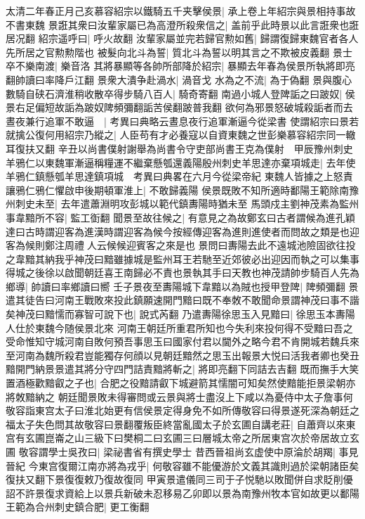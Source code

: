 太清二年春正月己亥慕容紹宗以鐵騎五千夹擊侯景|{
	承上卷上年紹宗與景相持事故不書東魏}
景誑其衆曰汝輩家屬已為高澄所殺衆信之|{
	盖前乎此時景以此言誑衆也誑居况翻}
紹宗遥呼曰|{
	呼火故翻}
汝輩家屬並完若歸官勲如舊|{
	歸謂復歸東魏官者各人先所居之官勲勲階也}
被髮向北斗為誓|{
	質北斗為誓以明其言之不欺被皮義翻}
景士卒不樂南渡|{
	樂音洛}
其將暴顯等各帥所部降於紹宗|{
	暴顯去年春為侯景所執將即亮翻帥讀曰率降戶江翻}
景衆大潰争赴渦水|{
	渦音戈}
水為之不流|{
	為于偽翻}
景與腹心數騎自硖石濟淮稍收散卒得步騎八百人|{
	騎奇寄翻}
南過小城人登陴詬之曰跛奴|{
	侯景右足偏短故詬為跛奴陴頻彌翻詬苦侯翻跛普我翻}
欲何為邪景怒破城殺詬者而去晝夜兼行追軍不敢逼　|{
	考異曰典略云晝息夜行追軍漸逼今從梁書}
使謂紹宗曰景若就擒公復何用紹宗乃縱之|{
	人臣苟有才必養寇以自資東魏之世彭樂慕容紹宗同一轍耳復扶又翻}
辛丑以尚書僕射謝舉為尚書令守吏部尚書王克為僕射　甲辰豫州刺史羊鴉仁以東魏軍漸逼稱糧運不繼棄懸瓠還義陽殷州刺史羊思達亦棄項城走|{
	去年使羊鴉仁鎮懸瓠羊思達鎮項城　考異曰典畧在六月今從梁帝紀}
東魏人皆據之上怒責讓鴉仁鴉仁懼啟申後期頓軍淮上|{
	不敢歸義陽}
侯景既敗不知所適時鄱陽王範除南豫州刺史未至|{
	去年遣蕭淵明攻彭城以範代鎮夀陽時猶未至}
馬頭戍主劉神茂素為監州事韋黯所不容|{
	監工衘翻}
聞景至故往候之|{
	有意見之為故鄭玄曰古者謂候為進孔穎達曰古時謂迎客為進漢時謂迎客為候今按經傳迎客為進則進使者而問故之類是也迎客為候則鄭注周禮人云候候迎賓客之來是也}
景問曰夀陽去此不遠城池險固欲往投之韋黯其納我乎神茂曰黯雖據城是監州耳王若馳至近郊彼必出迎因而執之可以集事得城之後徐以啟聞朝廷喜王南歸必不責也景執其手曰天教也神茂請帥步騎百人先為鄉導|{
	帥讀曰率鄉讀曰嚮}
壬子景夜至夀陽城下韋黯以為賊也授甲登陴|{
	陴頻彌翻}
景遣其徒告曰河南王戰敗來投此鎮願速開門黯曰既不奉敇不敢聞命景謂神茂曰事不諧矣神茂曰黯懦而寡智可說下也|{
	說式芮翻}
乃遣夀陽徐思玉入見黯曰|{
	徐思玉本夀陽人仕於東魏今随侯景北來}
河南王朝廷所重君所知也今失利來投何得不受黯曰吾之受命惟知守城河南自敗何預吾事思玉曰國家付君以閫外之略今君不肯開城若魏兵來至河南為魏所殺君豈能獨存何顔以見朝廷黯然之思玉出報景大悦曰活我者卿也癸丑黯開門納景景遣其將分守四門詰責黯將斬之|{
	將即亮翻下同詰去吉翻}
既而撫手大笑置酒極歡黯叡之子也|{
	合肥之役黯請叡下城避箭其懦闇可知矣然使黯能拒景梁朝亦將敇黯納之}
朝廷聞景敗未得審問或云景與將士盡沒上下咸以為憂侍中太子詹事何敬容詣東宫太子曰淮北始更有信侯景定得身免不如所傳敬容曰得景遂死深為朝廷之福太子失色問其故敬容曰景翻覆叛臣終當亂國太子於玄圃自講老莊|{
	自蕭齊以來東宫有玄圃崑崙之山三級下曰樊桐二曰玄圃三曰層城太帝之所居東宫次於帝居故立玄圃}
敬容謂學士吳孜曰|{
	梁祕書省有撰史學士}
昔西晉祖尚玄虚使中原淪於胡羯|{
	事見晉紀}
今東宫復爾江南亦將為戎乎|{
	何敬容雖不能優游於文義其識則過於梁朝諸臣矣復扶又翻下景復復敕乃復故復同}
甲寅景遣儀同三司于子悦馳以敗聞併自求貶削優詔不許景復求資給上以景兵新破未忍移易乙卯即以景為南豫州牧本官如故更以鄱陽王範為合州刺史鎮合肥|{
	更工衡翻}
